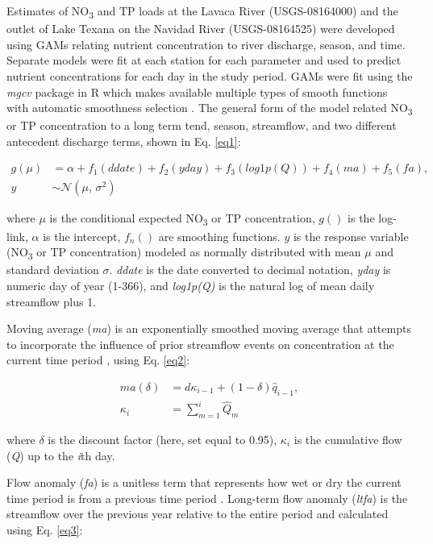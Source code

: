 \documentclass[sn-basic,referee,lineno,pdflatex]{sn-jnl}
\begin{document}
Estimates of NO\textsubscript{3} and TP loads at the Lavaca River
(USGS-08164000) and the outlet of Lake Texana on the Navidad River
(USGS-08164525) were developed using GAMs relating nutrient
concentration to river discharge, season, and time. Separate models were
fit at each station for each parameter and used to predict nutrient
concentrations for each day in the study period. GAMs were fit using the
\emph{mgcv} package in R which makes available multiple types of smooth
functions with automatic smoothness selection
\citep{woodFastStableRestricted2011}. The general form of the model
related NO\textsubscript{3} or TP concentration to a long term tend,
season, streamflow, and two different antecedent discharge terms, shown
in Eq. \ref{eq1}:

\begin{align}
g(\mu) &= \alpha + f_1(ddate) + f_2(yday) + f_3(log1p(Q)) + f_4(ma) + f_5(fa), \nonumber \\
y &\sim \mathcal{N}(\mu,\,\sigma^{2})
\label{eq1}
\end{align}

where \(\mu\) is the conditional expected NO\textsubscript{3} or TP
concentration, \(g()\) is the log-link, \(\alpha\) is the intercept,
\(f_n()\) are smoothing functions. \(y\) is the response variable
(NO\textsubscript{3} or TP concentration) modeled as normally
distributed with mean \(\mu\) and standard deviation \(\sigma\).
\emph{ddate} is the date converted to decimal notation, \emph{yday} is
numeric day of year (1-366), and \emph{log1p(Q)} is the natural log of
mean daily streamflow plus 1.

Moving average (\emph{ma}) is an exponentially smoothed moving average
that attempts to incorporate the influence of prior streamflow events on
concentration at the current time period
\citep{wangLoadEstimationUncertainties2011, kuhnertQuantifyingTotalSuspended2012, zhang_improving_2017},
using Eq. \ref{eq2}:

\begin{align}
ma(\delta) &= d{\kappa_{i-1}}+(1-\delta)\hat{q}_{i-1}, \nonumber \\
\kappa_{i} &=\sum_{m=1}^{i}\hat{Q}_m
\label{eq2}
\end{align}

where \(\delta\) is the discount factor (here, set equal to 0.95),
\(\kappa_i\) is the cumulative flow (\emph{Q}) up to the \emph{i}th day.

Flow anomaly (\emph{fa}) is a unitless term that represents how wet or
dry the current time period is from a previous time period
\citep{vecchiaTrendsConcentrationsUse2009, zhang_improving_2017}.
Long-term flow anomaly (\emph{ltfa}) is the streamflow over the previous
year relative to the entire period \citep{zhang_improving_2017} and
calculated using Eq. \ref{eq3}:
\end{document}
